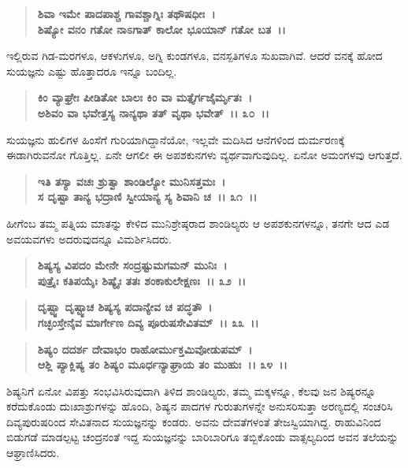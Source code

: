 \begin{verse}
\textbf{ಶಿವಾ ಇಮೇ ಪಾದಪಾಶ್ಚ ಗಾವಶ್ಚಾಗ್ನಿಃ ತಥೌಷಧೀಃ~।}\\\textbf{ಶಿಷ್ಯೋ ವನಂ ಗತೋ ನಾಽಗಾತ್ ಕಾಲೋ ಭೂಯಾನ್ ಗತೋ ಬತ~।।}
\end{verse}

ಇಲ್ಲಿರುವ ಗಿಡ-ಮರಗಳೂ, ಆಕಳುಗಳೂ, ಅಗ್ನಿ ಕುಂಡಗಳೂ, ವನಸ್ಪತಿಗಳೂ ಸುಖವಾಗಿವೆ. ಆದರೆ ವನಕ್ಕೆ ಹೋದ ಸುಯಜ್ಞನು ಎಷ್ಟು ಹೊತ್ತಾದರೂ ಇನ್ನೂ ಬಂದಿಲ್ಲ.

\begin{verse}
\textbf{ಕಿಂ ವ್ಯಾಘ್ರೇಃ ಪೀಡಿತೋ ಬಾಲಃ ಕಿಂ ವಾ ಮತ್ತೈರ್ಗಜೈರ್ಮೃತಃ~।}\\\textbf{ಅಶಿವಂ ವಾ ಭವೇತ್ತಸ್ಯ ನಾನ್ಯಥಾ ತತ್ ವೃಥಾ ಭವೇತ್~।। ೩೦~।।}
\end{verse}

ಸುಯಜ್ಞನು ಹುಲಿಗಳ ಹಿಂಸೆಗೆ ಗುರಿಯಾಗಿದ್ದಾನೆಯೋ, ಇಲ್ಲವೇ ಮದಿಸಿದ ಆನೆಗಳಿಂದ ದುರ್ಮರಣಕ್ಕೆ ಈಡಾಗಿರುವನೋ ಗೊತ್ತಿಲ್ಲ. ಏನೇ ಆಗಲೀ ಈ ಅಪಶಕುನಗಳು ವ್ಯರ್ಥವಾಗುವುದಿಲ್ಲ. ಏನೋ ಅಮಂಗಳವು ಆಗುತ್ತದೆ.

\begin{verse}
\textbf{ಇತಿ ತಸ್ಯಾ ವಚಃ ಶ್ರುತ್ವಾ ಶಾಂಡಿಲ್ಯೋ ಮುನಿಸತ್ತಮಃ~।}\\\textbf{ಸ ದೃಷ್ಟಾ ತಾನ್ಯ ಭದ್ರಾಣಿ ಸ್ವೀಯಾನ್ಯ ಸ್ಯ ಶಿವಾನಿ ಚ~।। ೩೧~।।}
\end{verse}

ಹೀಗೆಂಬ ತಮ್ಮ ಪತ್ನಿಯ ಮಾತನ್ನು ಕೇಳಿದ ಮುನಿಶ್ರೇಷ್ಠರಾದ ಶಾಂಡಿಲ್ಯರು ಆ ಅಪಶಕುನಗಳನ್ನೂ, ತನಗೇ ಆದ ಎಡ ಅವಯವಗಳು ಅದರುವುದನ್ನೂ ವಿಮರ್ಶಿಸಿದರು.

\begin{verse}
\textbf{ಶಿಷ್ಯಸ್ಯ ವಿಪದಂ ಮೇನೇ ಸಂದ್ರಷ್ಟುಮಗಮನ್ ಮುನಿಃ~।}\\\textbf{ಪುತ್ರೈಃ ಕತಿಪಯೈಃ ಶಿಷ್ಯೈಃ ತತಃ ಶಂಕಾಕುಲೇಕ್ಷಣಃ~।। ೩೨~।।} 
\end{verse}

\begin{verse}
\textbf{ದೃಷ್ಟ್ವಾ ದೃಷ್ಟ್ವಾಚ ಶಿಷ್ಯಸ್ಯ ಪದಾನ್ಯೇವ ಚ ಪದ್ಧತೌ~।}\\\textbf{ಗಚ್ಛಂಸ್ತೇನೈವ ಮಾರ್ಗೇಣ ದಿವ್ಯ ಪೂರುಷಸೇವಿತಮ್~।। ೩೩~।।} 
\end{verse}

\begin{verse}
\textbf{ಶಿಷ್ಯಂ ದದರ್ಶ ದೇವಾಭಂ ರಾಹೋರ್ಮುಕ್ತಮಿವೋಡುಪಮ್~।}\\\textbf{ಆಶ್ಲಿ ಪ್ಯಾಕ್ಲಿಷ್ಯ ತಂ ಶಿಷ್ಯಂ ಮೂರ್ಧನ್ಯಾಘ್ರಾಯ ತಂ ಮುಹುಃ~।। ೩೪~।।}
\end{verse}

ಶಿಷ್ಯನಿಗೆ ಏನೋ ವಿಪತ್ತು ಸಂಭವಿಸಿರುವುದಾಗಿ ತಿಳಿದ ಶಾಂಡಿಲ್ಯರು, ತಮ್ಮ ಮಕ್ಕಳನ್ನೂ, ಕೆಲವು ಜನ ಶಿಷ್ಯರನ್ನೂ ಕರೆದುಕೊಂಡು ದುಃಖಾಶ್ರುಗಳನ್ನು ಹೊಂದಿ, ಶಿಷ್ಯನ ಪಾದಗಳ ಗುರುತುಗಳನ್ನೇ ಅನುಸರಿಸುತ್ತಾ ಅರಣ್ಯದಲ್ಲಿ ಸಂಚರಿಸಿ ದಿವ್ಯಪುರುಷರಿಂದ ಸೇವಿತನಾದ ಸುಯಜ್ಞನನ್ನು ಕಂಡರು. ಅವನು ದೇವತೆಗಳಂತೆ ತೇಜಸ್ವಿಯಾಗಿದ್ದ. ರಾಹುವಿನಿಂದ ಬಿಡುಗಡೆ ಮಾಡಲ್ಪಟ್ಟ ಚಂದ್ರನಂತೆ ಇದ್ದ ಸುಯಜ್ಞನನ್ನು ಬಾರಿಬಾರಿಗೂ ತಬ್ಬಿಕೊಂಡು ವಾತ್ಸಲ್ಯದಿಂದ ಅವನ ತಲೆಯನ್ನು ಆಘ್ರಾಣಿಸಿದರು.

